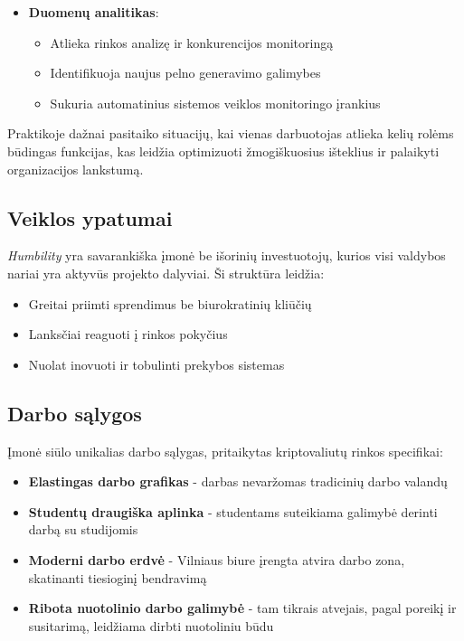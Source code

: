 \documentclass[]{VUMIFTemplateClass}
\begin{document}
\begin{itemize}
\item \textbf{Duomenų analitikas}:
\begin{itemize}
\item Atlieka rinkos analizę ir konkurencijos monitoringą
\item Identifikuoja naujus pelno generavimo galimybes
\item Sukuria automatinius sistemos veiklos monitoringo įrankius
\end{itemize}

\end{itemize}

Praktikoje dažnai pasitaiko situacijų, kai vienas darbuotojas atlieka kelių rolėms būdingas funkcijas, kas leidžia optimizuoti žmogiškuosius išteklius ir palaikyti organizacijos lankstumą.

\subsection{Veiklos ypatumai}
\textit{Humbility} yra savarankiška įmonė be išorinių investuotojų, kurios visi valdybos nariai yra aktyvūs projekto dalyviai. Ši struktūra leidžia:
\begin{itemize}
\item Greitai priimti sprendimus be biurokratinių kliūčių
\item Lanksčiai reaguoti į rinkos pokyčius
\item Nuolat inovuoti ir tobulinti prekybos sistemas
\end{itemize}

\subsection{Darbo sąlygos}
Įmonė siūlo unikalias darbo sąlygas, pritaikytas kriptovaliutų rinkos specifikai:
\begin{itemize}
\item \textbf{Elastingas darbo grafikas} - darbas nevaržomas tradicinių darbo valandų
\item \textbf{Studentų draugiška aplinka} - studentams suteikiama galimybė derinti darbą su studijomis
\item \textbf{Moderni darbo erdvė} - Vilniaus biure įrengta atvira darbo zona, skatinanti tiesioginį bendravimą
\item \textbf{Ribota nuotolinio darbo galimybė} - tam tikrais atvejais, pagal poreikį ir susitarimą, leidžiama dirbti nuotoliniu būdu
\end{itemize}
\end{document}
